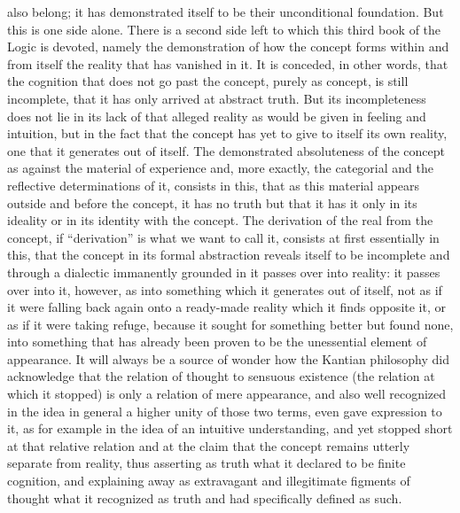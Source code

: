 also belong;
it has demonstrated itself to be
their unconditional foundation.
But this is one side alone.
There is a second side left
to which this third book of the Logic is devoted,
namely the demonstration of how
the concept forms within and from itself
the reality that has vanished in it.
It is conceded, in other words,
that the cognition that does not go past the concept,
purely as concept, is still incomplete,
that it has only arrived at abstract truth.
But its incompleteness does not lie in
its lack of that alleged reality as would be
given in feeling and intuition,
but in the fact that the concept has yet to give
to itself its own reality,
one that it generates out of itself.
The demonstrated absoluteness of the concept
as against the material of experience and, more exactly,
the categorial and the reflective determinations of it,
consists in this,
that as this material appears
outside and before the concept,
it has no truth but that it has it only in its ideality
or in its identity with the concept.
The derivation of the real from the concept,
if “derivation” is what we want to call it,
consists at first essentially in this,
that the concept in its formal abstraction
reveals itself to be incomplete
and through a dialectic immanently grounded in it
passes over into reality:
it passes over into it, however,
as into something which it generates out of itself,
not as if it were falling back again
onto a ready-made reality
which it finds opposite it,
or as if it were taking refuge,
because it sought for something better
but found none, into something
that has already been proven to be
the unessential element of appearance.
It will always be a source of wonder
how the Kantian philosophy did acknowledge
that the relation of thought to sensuous existence
(the relation at which it stopped)
is only a relation of mere appearance,
and also well recognized in the idea in general
a higher unity of those two terms,
even gave expression to it,
as for example in the idea
of an intuitive understanding,
and yet stopped short at that relative relation
and at the claim that the concept
remains utterly separate from reality,
thus asserting as truth
what it declared to be finite cognition,
and explaining away as extravagant
and illegitimate figments of thought
what it recognized as truth
and had specifically defined as such.

